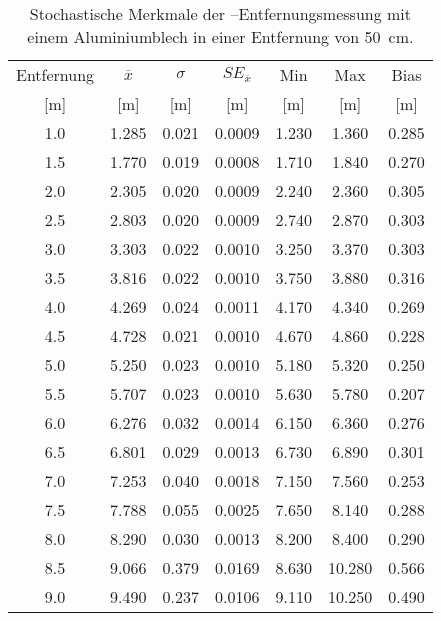 \begin{appendices}
\begin{table}[h]
	\centering
	\begin{tabular}{||c||ccc||cc||c||}
\hline
Entfernung & $\overline{x}$ & $\sigma$ & $SE_{\overline{x}}$ & Min & Max & Bias \\
{[}\si{\meter}{]} & {[}\si{\meter}{]} & {[}\si{\meter}{]} & {[}\si{\meter}{]} & {[}\si{\meter}{]} & {[}\si{\meter}{]} & {[}\si{\meter}{]} \\
\hline
\hline
\num{1.0} & \num{1.285} & \num{0.021} & \num{0.0009} & \num{1.230} & \num{1.360} & \num{0.285} \\
\num{1.5} & \num{1.770} & \num{0.019} & \num{0.0008} & \num{1.710} & \num{1.840} & \num{0.270} \\
\num{2.0} & \num{2.305} & \num{0.020} & \num{0.0009} & \num{2.240} & \num{2.360} & \num{0.305} \\
\num{2.5} & \num{2.803} & \num{0.020} & \num{0.0009} & \num{2.740} & \num{2.870} & \num{0.303} \\
\num{3.0} & \num{3.303} & \num{0.022} & \num{0.0010} & \num{3.250} & \num{3.370} & \num{0.303} \\
\num{3.5} & \num{3.816} & \num{0.022} & \num{0.0010} & \num{3.750} & \num{3.880} & \num{0.316} \\
\num{4.0} & \num{4.269} & \num{0.024} & \num{0.0011} & \num{4.170} & \num{4.340} & \num{0.269} \\
\num{4.5} & \num{4.728} & \num{0.021} & \num{0.0010} & \num{4.670} & \num{4.860} & \num{0.228} \\
\num{5.0} & \num{5.250} & \num{0.023} & \num{0.0010} & \num{5.180} & \num{5.320} & \num{0.250} \\
\num{5.5} & \num{5.707} & \num{0.023} & \num{0.0010} & \num{5.630} & \num{5.780} & \num{0.207} \\
\num{6.0} & \num{6.276} & \num{0.032} & \num{0.0014} & \num{6.150} & \num{6.360} & \num{0.276} \\
\num{6.5} & \num{6.801} & \num{0.029} & \num{0.0013} & \num{6.730} & \num{6.890} & \num{0.301} \\
\num{7.0} & \num{7.253} & \num{0.040} & \num{0.0018} & \num{7.150} & \num{7.560} & \num{0.253} \\
\num{7.5} & \num{7.788} & \num{0.055} & \num{0.0025} & \num{7.650} & \num{8.140} & \num{0.288} \\
\num{8.0} & \num{8.290} & \num{0.030} & \num{0.0013} & \num{8.200} & \num{8.400} & \num{0.290} \\
\num{8.5} & \num{9.066} & \num{0.379} & \num{0.0169} & \num{8.630} & \num{10.280} & \num{0.566} \\
\num{9.0} & \num{9.490} & \num{0.237} & \num{0.0106} & \num{9.110} & \num{10.250} & \num{0.490} \\
\hline
	\end{tabular}
	\caption{Stochastische Merkmale der --Entfernungsmessung mit einem Aluminiumblech in einer Entfernung von \SI{50}{\centi\meter}.}
	\label{tab:entfernungsmessung_2018_01_20_nlos_metal}
\end{table}


\end{appendices}
